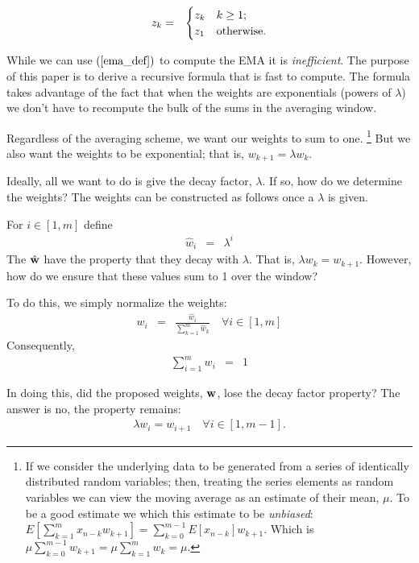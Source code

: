 \documentclass{article}
\begin{document}
\begin{eqnarray}
 z_{k} & = & \begin{cases}
     z_{k} & k \ge 1; \cr
     z_1 & \text{otherwise}. \cr
 \end{cases} \label{o:var_extend}
\end{eqnarray}

While we can use $(\ref{ema_def})$ to compute the EMA it is {\em inefficient\/}. 
The purpose of this
paper is to derive a recursive formula that is fast to compute.
The formula takes advantage of the fact that when the weights are exponentials
(powers of $\lambda$) we don't have to recompute the bulk of the sums in the 
averaging window.

Regardless of the averaging scheme, we want our weights to sum to one.%
\footnote{If we consider the underlying data to be generated from a series of identically distributed random
variables; then, treating the series elements as random variables we can view 
the moving average as an estimate of their mean, $\mu$. 
To be a good estimate we which this estimate to be {\em unbiased\/}:
$E\left[\sum_{k=1}^m x_{n-k} w_{k+1}\right] = \sum_{k=0}^{m-1} E[x_{n-k}]w_{k+1}$.
Which is $\mu \sum_{k=0}^{m-1} w_{k+1} = \mu \sum_{k=1}^{m} w_k = \mu$.}
But we also want the weights to be exponential; that is, $w_{k+1} = \lambda w_{k}$.

Ideally, all we want to do is give the decay factor, $\lambda$. If so, 
how do we determine the weights?
The weights can be constructed as follows once a $\lambda$ is given.

For $i \in [1, m]$ define
\begin{eqnarray}
    {\hat w}_i & = & \lambda^i 
\end{eqnarray}
The ${\hat {\bf w}}$ have the property that they decay with $\lambda$.
That is, $\lambda w_{k} = w_{k+1}$. However, how do we ensure that
these values sum to 1 over the window? 

To do this, we simply normalize the weights:
\begin{eqnarray}
w_i & = &  \frac{{\hat w}_i}{\sum_{k=1}^m {\hat w}_k} \quad \forall i \in [1, m]
\end{eqnarray}
Consequently,
\begin{eqnarray}
    \sum_{i=1}^m w_i & = & 1 \label{o:weights_normalized}
\end{eqnarray}

In doing this, did the proposed weights, ${\bf w}$, lose the decay factor
property? The answer is no, the property remains: 
\begin{eqnarray}
    \lambda w_{i} = w_{i+1} \quad \forall i \in [1, m-1]. \label{o:weights_power}
\end{eqnarray}
\end{document}
